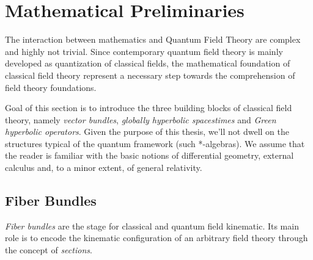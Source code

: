 \documentclass[Main]{subfiles}
\begin{document}
\chapter{Mathematical Preliminaries}
	The interaction between mathematics and Quantum Field Theory are complex and highly not trivial.
	Since contemporary quantum field theory is mainly developed as quantization of classical fields, the mathematical foundation of classical field theory represent a necessary step towards the comprehension of field theory foundations.
	
	Goal of this section is to introduce the three  building blocks of classical field theory, namely \emph{vector bundles}, \emph{globally hyperbolic spacestimes} and \emph{Green hyperbolic operators}.
	Given the purpose of this thesis, we'll not dwell on the structures typical of the quantum framework (such *-algebras).
	We assume that the reader is familiar with the basic notions of differential geometry, external calculus and, to a minor extent, of general relativity.
	\section{Fiber Bundles}
		\emph{Fiber bundles} are the stage for classical and quantum field kinematic.
		Its main role is to encode the kinematic configuration of an arbitrary field theory through the concept of
		\emph{sections}.
		
\end{document}

